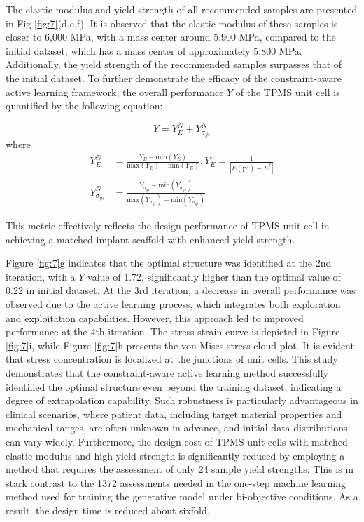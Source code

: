 \documentclass[preprint,review,12pt,authoryear]{elsarticle}
\begin{document}
The elastic modulus and yield strength of all recommended samples are presented in Fig \ref{fig:7}(d,e,f). It is observed that the elastic modulus of these samples is closer to 6,000 MPa, with a mass center around 5,900 MPa, compared to the initial dataset, which has a mass center of approximately 5,800 MPa. Additionally, the yield strength of the recommended samples surpasses that of the initial dataset. To further demonstrate the efficacy of the constraint-aware active learning framework, the overall performance $Y$ of the TPMS unit cell is quantified by the following equation:

\begin{equation}
    Y = Y_E^N+Y_{\sigma_{ys}}^N
\label{eq:23}
\end{equation}
where 
\begin{equation}
    \begin{aligned}
    Y_E^N &= \frac{Y_E-\text{min}(Y_E)}{\text{max}(Y_E)-\text{min}(Y_E)} 
 ,Y_E = \frac{1}{|E(\boldsymbol{p}')-E^*|}\\
    Y^N_{\sigma_{ys}}& =\frac{Y_{\sigma_{ys}}-\text{min}(Y_{\sigma_{ys}})}{\text{max}(Y_{\sigma_{ys}})-\text{min}(Y_{\sigma_{ys}})} 
    \end{aligned}
\label{eq:24}
\end{equation}

This metric effectively reflects the design performance of TPMS unit cell in achieving a matched implant scaffold with enhanced yield strength. 


Figure \ref{fig:7}g indicates that the optimal structure was identified at the 2nd iteration, with a $Y$ value of 1.72, significantly higher than the optimal value of 0.22 in initial dataset. At the 3rd iteration, a decrease in overall performance was observed due to the active learning process, which integrates both exploration and exploitation capabilities. However, this approach led to improved performance at the 4th iteration. The stress-strain curve is depicted in Figure \ref{fig:7}i, while Figure \ref{fig:7}h presents the von Mises stress cloud plot. It is evident that stress concentration is localized at the junctions of unit cells. This study demonstrates that the constraint-aware active learning method successfully identified the optimal structure even beyond the training dataset, indicating a degree of extrapolation capability. Such robustness is particularly advantageous in clinical scenarios, where patient data, including target material properties and mechanical ranges, are often unknown in advance, and initial data distributions can vary widely. Furthermore, the design cost of TPMS unit cells with matched elastic modulus and high yield strength is significantly reduced by employing a method that requires the assessment of only 24 sample yield strengths. This is in stark contrast to the 1372 assessments needed in the one-step machine learning method used for training the generative model under bi-objective conditions. As a result, the design time is reduced about sixfold.
\end{document}
